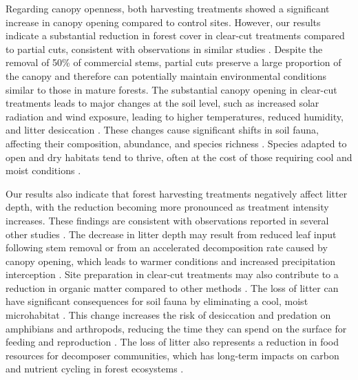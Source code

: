 
Regarding canopy openness, both harvesting treatments showed a significant increase in canopy opening compared to control sites.  
However, our results indicate a substantial reduction in forest cover in clear-cut treatments compared to partial cuts, consistent with observations in similar studies \citep{Nolet2018Comparingeffects,Mazerolle2021Woodlandsalamander}.  
Despite the removal of 50\% of commercial stems, partial cuts preserve a large proportion of the canopy and therefore can potentially maintain environmental conditions similar to those in mature forests.  
The substantial canopy opening in clear-cut treatments leads to major changes at the soil level, such as increased solar radiation and wind exposure, leading to higher temperatures, reduced humidity, and litter desiccation \citep{Keenan1993ecologicaleffects,Chen1999MicroclimateForest,Lindo2003Microbialbiomass,Brooks2008Forestfloor}.  
These changes cause significant shifts in soil fauna, affecting their composition, abundance, and species richness \citep{Staab2023Insectdecline}.  
Species adapted to open and dry habitats tend to thrive, often at the cost of those requiring cool and moist conditions \citep{Niemela2007effectsforestry,Ochs2022Responseterrestrial,Staab2023Insectdecline}.




Our results also indicate that forest harvesting treatments negatively affect litter depth, with the reduction becoming more pronounced as treatment intensity increases. 
These findings are consistent with observations reported in several other studies \citep{Marshall2000Impactsforest,Mazerolle2021Woodlandsalamander}. 
The decrease in litter depth may result from reduced leaf input following stem removal or from an accelerated decomposition rate caused by canopy opening, 
which leads to warmer conditions and increased precipitation interception \citep{Fierer2005LitterQuality,Butenschoen2011Interactiveeffects,Ameray2021Forestcarbon}. 
Site preparation in clear-cut treatments may also contribute to a reduction in organic matter compared to other methods \citep{Prevost1992Effetsscarifiage}. 
The loss of litter can have significant consequences for soil fauna by eliminating a cool, moist microhabitat \citep{spotilaRoleTemperatureWater1972,groverInfluenceCoverMoisture1998a,Niemela2007effectsforestry}. 
This change increases the risk of desiccation and predation on amphibians and arthropods, reducing the time they can spend on the surface for feeding and reproduction \citep{deMaynadier1995relationshipforest,koivula.LeafLitterSmallscale1999,Walton2013Topdownregulation}. 
The loss of litter also represents a reduction in food resources for decomposer communities, which has long-term impacts on carbon and nutrient cycling in forest ecosystems \citep{Handa2014Consequencesbiodiversity}. 


